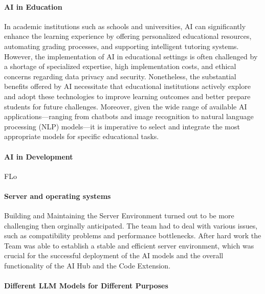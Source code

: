 \paragraph{AI in Education}

In academic institutions such as schools and universities, AI can significantly enhance the learning experience by offering personalized educational resources, 
automating grading processes, and supporting intelligent tutoring systems. However, the implementation of AI in educational settings is often challenged by a shortage of 
specialized expertise, high implementation costs, and ethical concerns regarding data privacy and security. Nonetheless, 
the substantial benefits offered by AI necessitate that educational institutions actively explore and adopt these technologies 
to improve learning outcomes and better prepare students for future challenges. Moreover, given the wide range of available AI applications—ranging from chatbots and image 
recognition to natural language processing (NLP) models—it is imperative to select and integrate the most appropriate models for specific educational tasks.

\paragraph{AI in Development}

FLo



\paragraph{Server and operating systems}

Building and Maintaining the Server Environment turned out to be more challenging then orginally anticipated. The team had to deal with various issues, such as compatibility problems and performance bottlenecks.
After hard work the Team was able to establish a stable and efficient server environment, which was crucial for the successful deployment of the AI models and the overall functionality of the AI Hub and the Code Extension.

\paragraph{Different LLM Models for Different Purposes}

